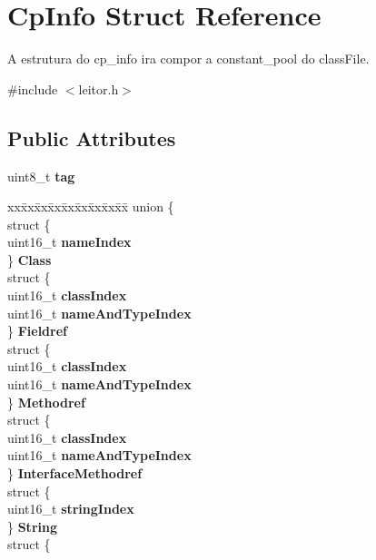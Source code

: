 \hypertarget{structCpInfo}{}\section{Cp\+Info Struct Reference}
\label{structCpInfo}


A estrutura do cp\+\_\+info ira compor a constant\+\_\+pool do class\+File.  




{\ttfamily \#include $<$leitor.\+h$>$}

\subsection*{Public Attributes}
\begin{DoxyCompactItemize}
\item 
\mbox{\label{structCpInfo_ac20d96c33f871bde2e903708a215a2dc}} 
uint8\+\_\+t {\bfseries tag}
\item 
\mbox{\label{structCpInfo_a67bf62f1bfb88277813bff0a1524a854}} 
\begin{tabbing}
xx\=xx\=xx\=xx\=xx\=xx\=xx\=xx\=xx\=\kill
union \{\\
\>struct \{\\
\>\>uint16\_t {\bfseries nameIndex}\\
\>\} {\bfseries Class}\\
\>struct \{\\
\>\>uint16\_t {\bfseries classIndex}\\
\>\>uint16\_t {\bfseries nameAndTypeIndex}\\
\>\} {\bfseries Fieldref}\\
\>struct \{\\
\>\>uint16\_t {\bfseries classIndex}\\
\>\>uint16\_t {\bfseries nameAndTypeIndex}\\
\>\} {\bfseries Methodref}\\
\>struct \{\\
\>\>uint16\_t {\bfseries classIndex}\\
\>\>uint16\_t {\bfseries nameAndTypeIndex}\\
\>\} {\bfseries InterfaceMethodref}\\
\>struct \{\\
\>\>uint16\_t {\bfseries stringIndex}\\
\>\} {\bfseries String}\\
\>struct \{\\

\end{tabbing}
\end{DoxyCompactItemize}
